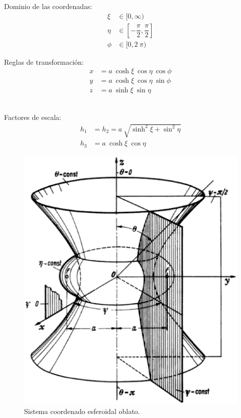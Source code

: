 \begin{minipage}{0.45\textwidth}
Dominio de las coordenadas:
\begin{align*}
\xi &\in [0, \infty) \\
\eta &\in \left[- \dfrac{\pi}{2}, \dfrac{\pi}{2} \right] \\
\phi &\in [0, 2\: \pi)
\end{align*}
\end{minipage}
\hspace{1cm}
\begin{minipage}{0.4\textwidth}
Reglas de transformación:
\begin{align*}
x &= a \: \cosh \xi \: \cos \eta \: \cos \phi \\
y &= a \: \cosh \xi \: \cos \eta \: \sin \phi\\
z &= a \: \sinh \xi \: \sin \eta
\end{align*}
\end{minipage}
\\[0.75em]
Factores de escala:
\begin{align*}
h_{1 }&= h_{2} = a \: \sqrt{\sinh^{2} \xi + \sin^{2} \eta} \\
h_{3 }&= a \: \cosh \xi \: \cos \eta
\end{align*}

\begin{figure}[H]
  \centering
  \includegraphics[scale=0.5]{Imagenes/Sistema_Esfeoridal_Oblato.eps}
  \caption{Sistema coordenado esferoidal oblato.}
\end{figure}

